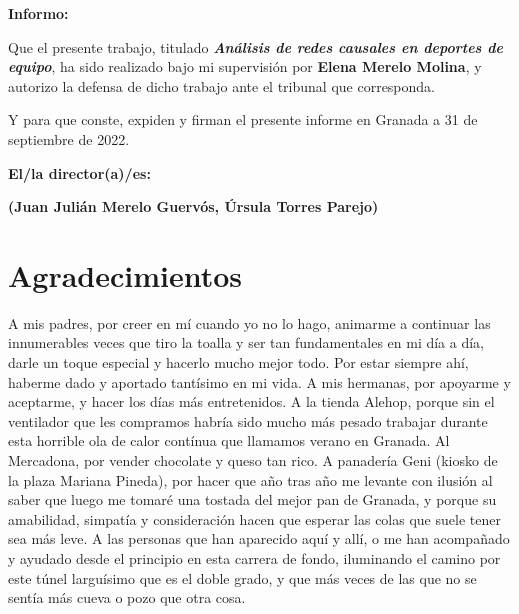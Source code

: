 \textbf{Informo:}

\vspace{0.5cm}

Que el presente trabajo, titulado \textit{\textbf{Análisis de redes causales en deportes de equipo}},
ha sido realizado bajo mi supervisión por \textbf{Elena Merelo Molina}, y autorizo la defensa de dicho 
trabajo ante el tribunal que corresponda.

\vspace{0.5cm}

Y para que conste, expiden y firman el presente informe en Granada a 31 de septiembre de 2022.

\vspace{1cm}

\textbf{El/la director(a)/es: }

\vspace{5cm}

\noindent \textbf{(Juan Julián Merelo Guervós, Úrsula Torres Parejo)}

\chapter*{Agradecimientos} \label{agradec}

A mis padres, por creer en mí cuando yo no lo hago, animarme a continuar las innumerables veces que tiro la 
toalla y ser tan fundamentales en mi día a día, darle un toque especial y hacerlo mucho mejor todo. Por estar 
siempre ahí, haberme dado y aportado tantísimo en mi vida. A mis hermanas, por apoyarme y aceptarme, y hacer los 
días más entretenidos. A la tienda Alehop, porque sin el ventilador que les compramos habría sido mucho 
más pesado trabajar durante esta horrible ola de calor contínua que llamamos verano en Granada. Al Mercadona, 
por vender chocolate y queso tan rico. A panadería Geni (kiosko de la plaza Mariana Pineda), por hacer que año tras 
año me levante con ilusión al saber que luego me tomaré una tostada del mejor pan de Granada, y porque su 
amabilidad, simpatía y consideración hacen que esperar las colas que suele tener sea más leve. A las personas 
que han aparecido aquí y allí, o me han acompañado y ayudado desde el principio en esta carrera de fondo, 
iluminando el camino por este túnel larguísimo que es el doble grado, y que más veces de las que no se 
sentía más cueva o pozo que otra cosa. 


